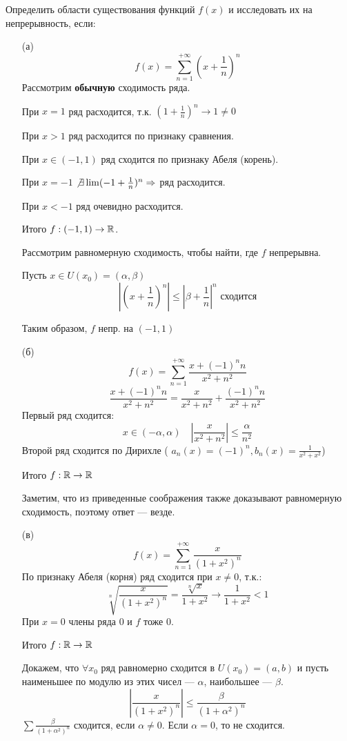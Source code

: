 \begin{exercise}[2795]
    Определить области существования функций \(f(x)\) и исследовать их на непрерывность, если:
    \begin{enumerate}
        \item [(а)] \[f(x) = \sum_{n = 1}^{+\infty} \left( x + \frac{1}{n} \right)^n\]
              Рассмотрим \textbf{обычную} сходимость ряда.

              При \(x = 1\) ряд расходится, т.к. \((1 + \frac{1}{n})^n \to 1 \neq 0\)

              При \(x > 1\) ряд расходится по признаку сравнения.

              При \(x \in (- 1, 1)\) ряд сходится по признаку Абеля (корень).

              При \(x = - 1\) \(\not \exists \lim ( - 1 + \frac{1}{n})^n \Rightarrow \) ряд расходится.

              При \(x < - 1\) ряд очевидно расходится.

              Итого \(f : ( - 1, 1) \to \mathbb{R}\).

              Рассмотрим равномерную сходимость, чтобы найти, где \(f\) непрерывна.

              Пусть \(x\in U(x_0) = (\alpha, \beta)\)
              \[\left|\left( x + \frac{1}{n} \right)^n\right| \leq \left| \beta + \frac{1}{n}\right|^n \text{ сходится}\]

              Таким образом, \(f\) непр. на \(( - 1, 1)\)
        \item [(б)] \[f(x) = \sum_{n = 1}^{+\infty} \frac{x + ( - 1)^n n}{x^2 + n^2} \]
              \[\frac{x + ( - 1)^n n}{x^2 + n^2} = \frac{x}{x^2 + n^2} + \frac{( - 1)^n n}{x^2 + n^2} \]
              Первый ряд сходится:
              \[x\in ( - \alpha, \alpha) \quad \left|\frac{x}{x^2 + n^2}\right| \leq \frac{\alpha}{n^2}\]
              Второй ряд сходится по Дирихле ( \(a_n(x) = ( - 1)^n, b_n(x) = \frac{1}{x^2 + x^2}\))

              Итого \(f : \mathbb{R} \to \mathbb{R}\)

              Заметим, что из приведенные соображения также доказывают равномерную сходимость, поэтому ответ --- везде.
        \item [(в)] \[f(x) = \sum_{n = 1}^{+\infty} \frac{x}{(1 + x^2)^n} \]
              По признаку Абеля (корня) ряд сходится при \(x \neq 0\), т.к.:
              \[\sqrt[n]{\frac{x}{(1 + x^2)^n}} = \frac{\sqrt[n]{x}}{1 + x^2} \to \frac{1}{1 + x^2} < 1\]
              При \(x = 0\) члены ряда 0 и \(f\) тоже \(0\).

              Итого \(f : \mathbb{R}\to \mathbb{R}\)

              Докажем, что \(\forall x_0\) ряд равномерно сходится в \(U(x_0) = (a, b)\) и пусть наименьшее по модулю из этих чисел --- \(\alpha\), наибольшее --- \(\beta\).
              \[\left|\frac{x}{(1 + x^2)^n}\right| \leq \frac{\beta}{(1 + \alpha^2)^n}\]
              \(\sum \frac{\beta}{(1 + \alpha^2)^n}\) сходится, если \(\alpha \neq 0\). Если \(\alpha = 0\), то не сходится.
    \end{enumerate}
\end{exercise}

